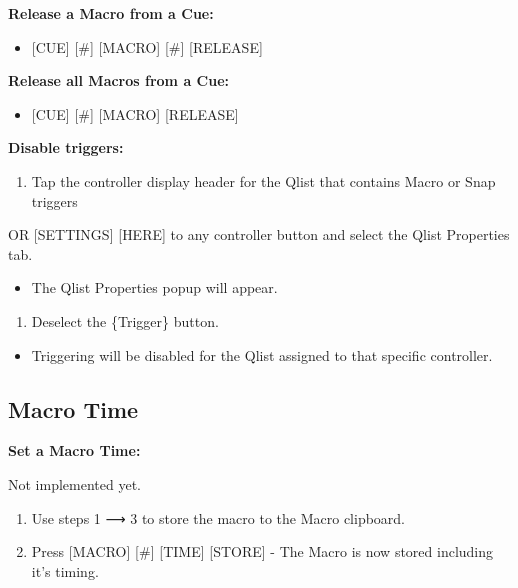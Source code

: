 \documentclass[
]{article}
\providecommand{\tightlist}{%
  \setlength{\itemsep}{0pt}\setlength{\parskip}{0pt}}
\begin{document}
\textbf{Release a Macro from a Cue:}

\begin{itemize}
\tightlist
\item
  {[}CUE{]} {[}\#{]} {[}MACRO{]} {[}\#{]} {[}RELEASE{]}
\end{itemize}

\textbf{Release all Macros from a Cue:}

\begin{itemize}
\tightlist
\item
  {[}CUE{]} {[}\#{]} {[}MACRO{]} {[}RELEASE{]}
\end{itemize}

\textbf{Disable triggers:}

\begin{enumerate}
\def\labelenumi{\arabic{enumi}.}
\tightlist
\item
  Tap the controller display header for the Qlist that contains Macro or Snap triggers
\end{enumerate}

OR {[}SETTINGS{]} {[}HERE{]} to any controller button and select the Qlist Properties tab.

\begin{itemize}
\tightlist
\item
  The Qlist Properties popup will appear.
\end{itemize}

\begin{enumerate}
\def\labelenumi{\arabic{enumi}.}
\setcounter{enumi}{1}
\tightlist
\item
  Deselect the \{Trigger\} button.
\end{enumerate}

\begin{itemize}
\tightlist
\item
  Triggering will be disabled for the Qlist assigned to that specific controller.
\end{itemize}

\hypertarget{Macro-Time-13.4}{%
\subsection{Macro Time}\label{Macro-Time-13.4}}

\textbf{Set a Macro Time:}

{Not implemented yet.}

\begin{enumerate}
\def\labelenumi{\arabic{enumi}.}
\item
  {Use steps 1 ⟶ 3 to store the macro to the Macro clipboard.}
\item
  {Press {[}MACRO{]} {[}\#{]} {[}TIME{]} {[}STORE{]} - The Macro is now stored including it's timing.}
\end{enumerate}
\end{document}
